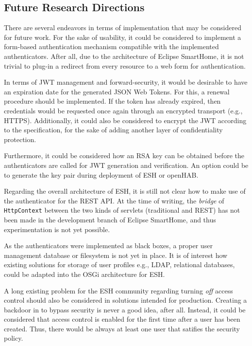 \documentclass[12pt]{article}
\begin{document}
\subsection{Future Research Directions}

There are several endeavors in terms of implementation that may be considered for future work. For the sake of usability, it could be considered to implement a form-based authentication mechanism compatible with the implemented authenticators. After all, due to the architecture of Eclipse SmartHome, it is not trivial to plug-in a redirect from every resource to a web form for authentication.

In terms of JWT management and forward-security, it would be desirable to have an expiration date for the generated JSON Web Tokens. For this, a renewal procedure should be implemented. If the token has already expired, then credentials would be requested once again through an encrypted transport (e.g., HTTPS). Additionally, it could also be considered to encrypt the JWT according to the specification, for the sake of adding another layer of confidentiality protection.

Furthermore, it could be considered how an RSA key can be obtained before the authenticators are called for JWT generation and verification. An option could be to generate the key pair during deployment of ESH or openHAB. 

Regarding the overall architecture of ESH, it is still not clear how to make use of the authenticator for the REST API. At the time of writing, the \emph{bridge} of \texttt{HttpContext} between the two kinds of servlets (traditional and REST) has not been made in the development branch of Eclipse SmartHome, and thus experimentation is not yet possible.

As the authenticators were implemented as black boxes, a proper user management database or filesystem is not yet in place. It is of interest how existing solutions for storage of user profiles e.g., LDAP, relational databases, could be adapted into the OSGi architecture for ESH.

A long existing problem for the ESH community regarding turning \emph{off} access control should also be considered in solutions intended for production. Creating a backdoor in to bypass security is never a good idea, after all. Instead, it could be considered that access control is enabled for the first time after a user has been created. Thus, there would be always at least one user that satifies the security policy. 
\end{document}

